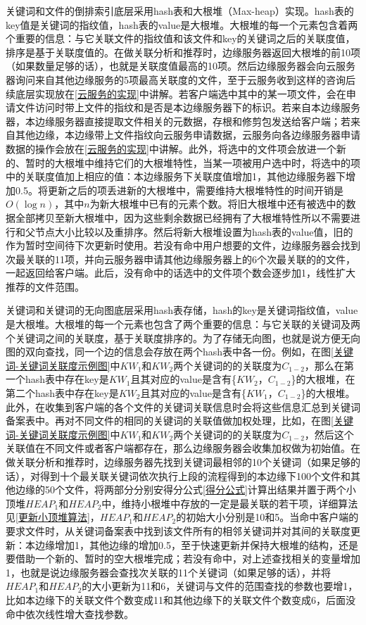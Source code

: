 \documentclass[promaster]{thesis-uestc}
\begin{document}
关键词和文件的倒排索引底层采用hash表和大根堆（Max-heap）实现。hash表的key值是关键词的指纹值，hash表的value是大根堆。大根堆的每一个元素包含着两个重要的信息：与它关联文件的指纹值和该文件和key的关键词之后的关联度值，排序是基于关联度值的。在做关联分析和推荐时，边缘服务器返回大根堆的前10项（如果数量足够的话），也就是关联度值最高的10项。然后边缘服务器会向云服务器询问来自其他边缘服务的5项最高关联度的文件，至于云服务收到这样的咨询后续底层实现放在\ref{云服务的实现}中讲解。若客户端选中其中的某一项文件，会在申请文件访问时带上文件的指纹和是否是本边缘服务器下的标识。若来自本边缘服务器，本边缘服务器直接提取文件相关的元数据，存根和修剪包发送给客户端；若来自其他边缘，本边缘带上文件指纹向云服务申请数据，云服务向各边缘服务器申请数据的操作会放在\ref{云服务的实现}中讲解。此外，将选中的文件项会放进一个新的、暂时的大根堆中维持它们的大根堆特性，当某一项被用户选中时，将选中的项中的关联度值加上相应的值：本边缘服务下关联度值增加1，其他边缘服务器下增加0.5。将更新之后的项丢进新的大根堆中，需要维持大根堆特性的时间开销是$O(\log n)$，其中$n$为新大根堆中已有的元素个数。将旧大根堆中还有被选中的数据全部拷贝至新大根堆中，因为这些剩余数据已经拥有了大根堆特性所以不需要进行和父节点大小比较以及重排序。然后将新大根堆设置为hash表的value值，旧的作为暂时空间待下次更新时使用。若没有命中用户想要的文件，边缘服务器会找到次最关联的11项，并向云服务器申请其他边缘服务器上的6个次最关联的的文件，一起返回给客户端。此后，没有命中的话选中的文件项个数会逐步加1，线性扩大推荐的文件范围。

关键词和关键词的无向图底层采用hash表存储，hash的key是关键词指纹值，value是大根堆。大根堆的每一个元素也包含了两个重要的信息：与它关联的关键词及两个关键词之间的关联度，基于关联度排序的。为了存储无向图，也就是说方便无向图的双向查找，同一个边的信息会存放在两个hash表中各一份。例如，在图\ref{关键词-关键词关联度示例图}中$KW_1$和$KW_2$两个关键词的的关联度为$C_{1-2}$，那么在第一个hash表中存在key是$KW_1$且其对应的value是含有\{$KW_2$，$C_{1-2}$\}的大根堆，在第二个hash表中存在key是$KW_2$且其对应的value是含有\{$KW_1$，$C_{1-2}$\}的大根堆。此外，在收集到客户端的各个文件的关键词关联信息时会将这些信息汇总到关键词备案表中。再对不同文件的相同的关键词的关联值做加权处理，比如，在图\ref{关键词-关键词关联度示例图}中$KW_1$和$KW_2$两个关键词的的关联度为$C_{1-2}$，然后这个关联值在不同文件或者客户端都存在，那么边缘服务器会收集加权做为初始值。在做关联分析和推荐时，边缘服务器先找到关键词最相邻的10个关键词（如果足够的话），对得到十个最关联关键词依次执行上段的流程得到的本边缘下100个文件和其他边缘的50个文件，将两部分分别安得分公式\ref{得分公式}计算出结果并置于两个小顶堆$HEAP_1$和$HEAP_2$中，维持小根堆中存放的一定是最关联的若干项，详细算法见\ref{更新小顶堆算法}，$HEAP_1$和$HEAP_2$的初始大小分别是10和5。当命中客户端的要求文件时，从关键词备案表中找到该文件所有的相邻关键词并对其间的关联度更新：本边缘增加1，其他边缘的增加0.5，至于快速更新并保持大根堆的结构，还是要借助一个新的、暂时的空大根堆完成；若没有命中，对上述查找相关的变量增加1，也就是说边缘服务器会查找次关联的11个关键词（如果足够的话），并将$HEAP_1$和$HEAP_2$的大小更新为11和6，关键词与文件的范围查找的参数也要增1，比如本边缘下的关联文件个数变成11和其他边缘下的关联文件个数变成6，后面没命中依次线性增大查找参数。
\end{document}
